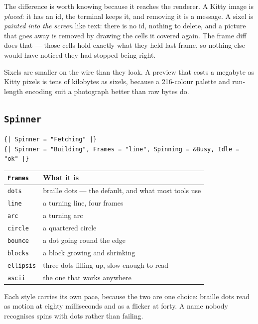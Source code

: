 \documentclass[11pt,a4paper,twoside,openany]{book}
\newcommand{\code}[1]{\texttt{\small #1}}
\begin{document}
The difference is worth knowing because it reaches the renderer. A Kitty image is
\emph{placed}: it has an id, the terminal keeps it, and removing it is a message. A
sixel is \emph{painted into the screen} like text: there is no id, nothing to
delete, and a picture that goes away is removed by drawing the cells it covered
again. The frame diff does that --- those cells hold exactly what they held last
frame, so nothing else would have noticed they had stopped being right.

\begin{tipbox}
Sixels are smaller on the wire than they look. A preview that costs a megabyte as
Kitty pixels is tens of kilobytes as sixels, because a 216-colour palette and
run-length encoding suit a photograph better than raw bytes do.
\end{tipbox}

\subsection{\texttt{Spinner}}

\begin{lstlisting}
{| Spinner = "Fetching" |}
{| Spinner = "Building", Frames = "line", Spinning = &Busy, Idle = "ok" |}
\end{lstlisting}

\begin{center}
\begin{tabular}{@{}ll@{}}
\toprule
\textbf{\normalfont\sffamily \texttt{Frames}} & \textbf{\normalfont\sffamily What it is} \\
\midrule
\code{dots}     & braille dots --- the default, and what most tools use \\
\code{line}     & a turning line, four frames \\
\code{arc}      & a turning arc \\
\code{circle}   & a quartered circle \\
\code{bounce}   & a dot going round the edge \\
\code{blocks}   & a block growing and shrinking \\
\code{ellipsis} & three dots filling up, slow enough to read \\
\code{ascii}    & the one that works anywhere \\
\bottomrule
\end{tabular}
\end{center}

Each style carries its own pace, because the two are one choice: braille dots read
as motion at eighty milliseconds and as a flicker at forty. A name nobody
recognises spins with dots rather than failing.
\end{document}
